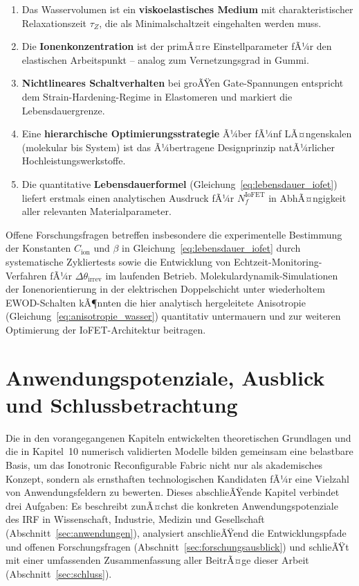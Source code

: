 ﻿\documentclass[a4paper,12pt]{scrreprt}
\theoremstyle{definition}
\begin{document}
\begin{enumerate}
	\item Das Wasservolumen ist ein \textbf{viskoelastisches Medium} mit
	charakteristischer Relaxationszeit $\tau_Z$, die als Minimalschaltzeit
	eingehalten werden muss.
	\item Die \textbf{Ionenkonzentration} ist der primÃ¤re Einstellparameter
	fÃ¼r den elastischen Arbeitspunkt -- analog zum Vernetzungsgrad in Gummi.
	\item \textbf{Nichtlineares Schaltverhalten} bei groÃŸen Gate-Spannungen
	entspricht dem Strain-Hardening-Regime in Elastomeren und markiert die
	Lebensdauergrenze.
	\item Eine \textbf{hierarchische Optimierungsstrategie} Ã¼ber fÃ¼nf
	LÃ¤ngenskalen (molekular bis System) ist das Ã¼bertragene Designprinzip
	natÃ¼rlicher Hochleistungswerkstoffe.
	\item Die quantitative \textbf{Lebensdauerformel}
	(Gleichung~\eqref{eq:lebensdauer_iofet}) liefert erstmals einen
	analytischen Ausdruck fÃ¼r $N_f^{\mathrm{IoFET}}$ in AbhÃ¤ngigkeit
	aller relevanten Materialparameter.
\end{enumerate}

Offene Forschungsfragen betreffen insbesondere die experimentelle Bestimmung
der Konstanten $C_{\mathrm{ion}}$ und $\beta$ in
Gleichung~\eqref{eq:lebensdauer_iofet} durch systematische Zykliertests
sowie die Entwicklung von Echtzeit-Monitoring-Verfahren fÃ¼r
$\Delta\theta_{\mathrm{irrev}}$ im laufenden Betrieb. Molekulardynamik-Simulationen
der Ionenorientierung in der elektrischen Doppelschicht unter
wiederholtem EWOD-Schalten kÃ¶nnten die hier analytisch hergeleitete
Anisotropie (Gleichung~\eqref{eq:anisotropie_wasser}) quantitativ
untermauern und zur weiteren Optimierung der IoFET-Architektur beitragen.

\section{Anwendungspotenziale, Ausblick und Schlussbetrachtung}
\label{sec:ausblick_und_schluss}

Die in den vorangegangenen Kapiteln entwickelten theoretischen Grundlagen
und die in Kapitel~10 numerisch validierten Modelle bilden gemeinsam eine
belastbare Basis, um das Ionotronic Reconfigurable Fabric nicht nur als
akademisches Konzept, sondern als ernsthaften technologischen Kandidaten
fÃ¼r eine Vielzahl von Anwendungsfeldern zu bewerten. Dieses abschlieÃŸende
Kapitel verbindet drei Aufgaben: Es beschreibt zunÃ¤chst die konkreten
Anwendungspotenziale des IRF in Wissenschaft, Industrie, Medizin und
Gesellschaft (Abschnitt~\ref{sec:anwendungen}), analysiert anschlieÃŸend
die Entwicklungspfade und offenen Forschungsfragen (Abschnitt~\ref{sec:forschungsausblick})
und schlieÃŸt mit einer umfassenden Zusammenfassung aller BeitrÃ¤ge dieser
Arbeit (Abschnitt~\ref{sec:schluss}).
\end{document}
